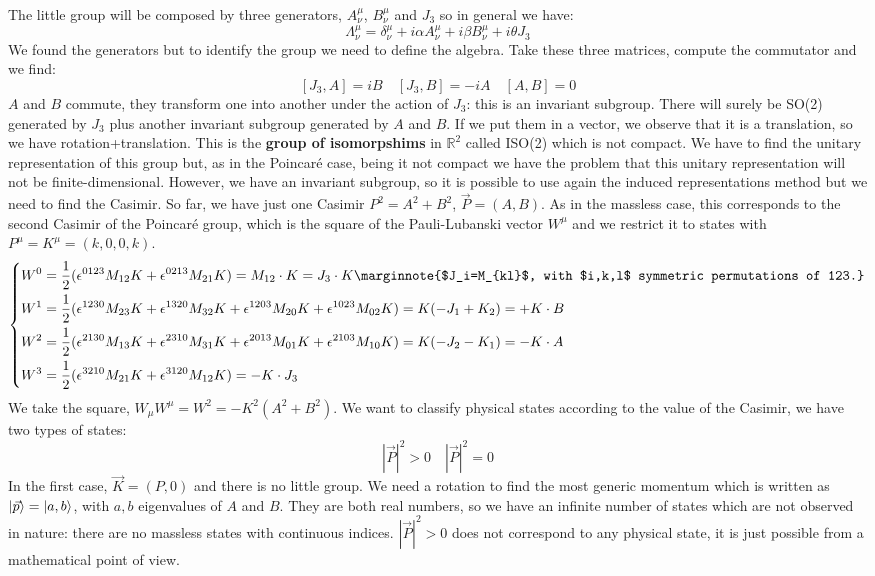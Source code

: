 \documentclass[../main.tex]{subfiles}
\begin{document}
The little group will be composed by three generators, $A^\mu_\nu$, $B^\mu_\nu$ and $J_3$ so in general we have:
\[
\Lambda^\mu_\nu=\delta^\mu_\nu+i\alpha A^\mu_\nu+i\beta B^\mu_\nu+i\theta J_3
\]
We found the generators but to identify the group we need to define the algebra. Take these three matrices, compute the commutator and we find:
\[
[J_3,A]=iB \quad [J_3,B]=-iA \quad [A,B]=0
\]
$A$ and $B$ commute, they transform one into another under the action of $J_3$: this is an invariant subgroup. There will surely be SO(2) generated by $J_3$ plus another invariant subgroup generated by $A$ and $B$. If we put them in a vector, we observe that it is a translation, so we have rotation+translation. This is the \textbf{group of isomorpshims} in $\mathbb{R}^2$ called ISO(2) which is not compact. We have to find the unitary representation of this group but, as in the Poincaré case, being it not compact we have the problem that this unitary representation will not be finite-dimensional. However, we have an invariant subgroup, so it is possible to use again the induced representations method but we need to find the Casimir. So far, we have just one Casimir $P^2=A^2+B^2$, $\vec{P}=(A,B)$. As in the massless case, this corresponds to the second Casimir of the Poincaré group, which is the square of the Pauli-Lubanski vector $W^\mu$ and we restrict it to states with $P^\mu=K^\mu=(k,0,0,k)$.
\[
\left\{
\begin{aligned}
&W^0=\frac{1}{2}(\epsilon^{0123}M_{12}K+\epsilon^{0213}M_{21}K)=M_{12}\cdot K=J_3\cdot K\marginnote{$J_i=M_{kl}$, with $i,k,l$ symmetric permutations of 123.}\\
&W^1=\frac{1}{2}(\epsilon^{1230}M_{23}K+\epsilon^{1320}M_{32}K+\epsilon^{1203}M_{20}K+\epsilon^{1023}M_{02}K)=K(-J_1+K_2)=+K\cdot B\\
&W^2=\frac{1}{2}(\epsilon^{2130}M_{13}K+\epsilon^{2310}M_{31}K+\epsilon^{2013}M_{01}K+\epsilon^{2103}M_{10}K)=K(-J_2-K_1)=-K\cdot A\\
&W^3=\frac{1}{2}(\epsilon^{3210}M_{21}K+\epsilon^{3120}M_{12}K)=-K\cdot J_3
\end{aligned}
\right.
\]
We take the square, $W_\mu W^\mu=W^2=-K^2(A^2+B^2)$. We want to classify physical states according to the value of the Casimir, we have two types of states:
\[
|\vec{P}|^2>0 \quad |\vec{P}|^2=0
\]
In the first case, $\vec{K}=(P,0)$ and there is no little group. We need a rotation to find the most generic momentum which is written as $\ket{\vec{p}}=\ket{a,b}$, with $a,b$ eigenvalues of $A$ and $B$. They are both real numbers, so we have an infinite number of states which are not observed in nature: there are no massless states with continuous indices. $|\vec{P}|^2>0$ does not correspond to any physical state, it is just possible from a mathematical point of view.\\
\end{document}
